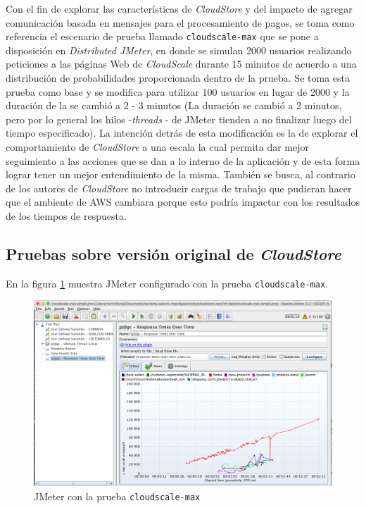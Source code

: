 \documentclass[11pt, twoside]{report}
\begin{document}
Con el fin de explorar las características de \emph{CloudStore} y del impacto de agregar comunicación basada en mensajes para el procesamiento de pagos, se toma como referencia el escenario de prueba llamado \texttt{cloudscale-max} que se pone a disposición en \emph{Distributed JMeter}, en donde se simulan 2000 usuarios realizando peticiones a las páginas Web de \emph{CloudScale} durante 15 minutos de acuerdo a una distribución de probabilidades proporcionada dentro de la prueba. Se toma esta prueba como base y se modifica para utilizar 100 usuarios en lugar de 2000 y la duración de la se cambió a 2 - 3 minutos (La duración se cambió a 2 minutos, pero por lo general los hilos -\emph{threads} - de JMeter tienden a no finalizar luego del tiempo especificado). La intención detrás de esta modificación es la de explorar el comportamiento de \emph{CloudStore} a una escala la cual permita dar mejor seguimiento a las acciones que se dan a lo interno de la aplicación y de esta forma lograr tener un mejor entendimiento de la misma. También se busca, al contrario de los autores de \emph{CloudStore} no introducir cargas de trabajo que pudieran hacer que el ambiente de AWS cambiara porque esto podría impactar con los resultados de los tiempos de respuesta. 

\subsection{Pruebas sobre versión original de \emph{CloudStore}}
En la figura \ref{fig:jmeter-1} muestra JMeter configurado con la prueba \texttt{cloudscale-max}.
\begin{figure}[h]
  \centering
  \includegraphics[width=13cm]{jmeter-1}
  \caption{\small{JMeter con la prueba \texttt{cloudscale-max}}}
  \label{fig:jmeter-1}
\end{figure}
\end{document}
